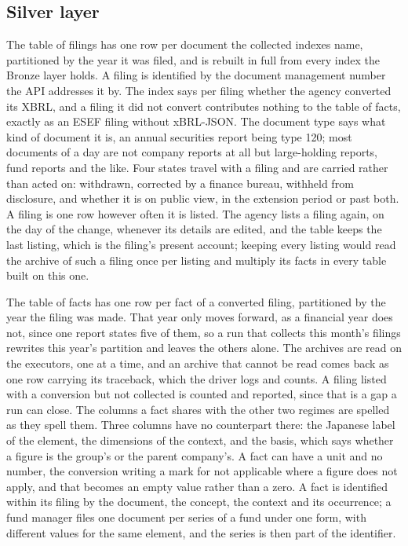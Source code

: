 \subsection{Silver layer}

The table of filings has one row per document the collected indexes name, partitioned by the year it was filed, and is rebuilt in full from every index the Bronze layer holds. A filing is identified by the document management number the API addresses it by. The index says per filing whether the agency converted its XBRL, and a filing it did not convert contributes nothing to the table of facts, exactly as an ESEF filing without xBRL-JSON. The document type says what kind of document it is, an annual securities report being type 120; most documents of a day are not company reports at all but large-holding reports, fund reports and the like. Four states travel with a filing and are carried rather than acted on: withdrawn, corrected by a finance bureau, withheld from disclosure, and whether it is on public view, in the extension period or past both. A filing is one row however often it is listed. The agency lists a filing again, on the day of the change, whenever its details are edited, and the table keeps the last listing, which is the filing's present account; keeping every listing would read the archive of such a filing once per listing and multiply its facts in every table built on this one.

The table of facts has one row per fact of a converted filing, partitioned by the year the filing was made. That year only moves forward, as a financial year does not, since one report states five of them, so a run that collects this month's filings rewrites this year's partition and leaves the others alone. The archives are read on the executors, one at a time, and an archive that cannot be read comes back as one row carrying its traceback, which the driver logs and counts. A filing listed with a conversion but not collected is counted and reported, since that is a gap a run can close. The columns a fact shares with the other two regimes are spelled as they spell them. Three columns have no counterpart there: the Japanese label of the element, the dimensions of the context, and the basis, which says whether a figure is the group's or the parent company's. A fact can have a unit and no number, the conversion writing a mark for not applicable where a figure does not apply, and that becomes an empty value rather than a zero. A fact is identified within its filing by the document, the concept, the context and its occurrence; a fund manager files one document per series of a fund under one form, with different values for the same element, and the series is then part of the identifier.

